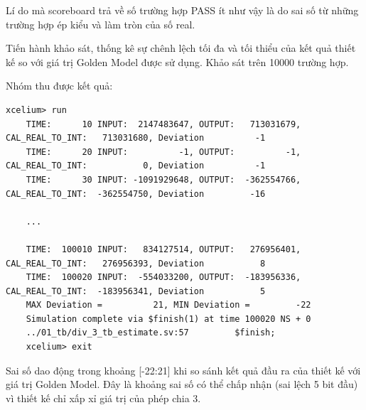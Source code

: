 \newpage

Lí do mà scoreboard trả về số trường hợp PASS ít như vậy là do sai số từ những trường hợp ép kiểu và làm tròn của số real.

Tiến hành khảo sát, thống kê sự chênh lệch tối đa và tối thiểu của kết quả thiết kế so với giá trị Golden Model được sử dụng. Khảo sát trên 10000 trường hợp.



Nhóm thu được kết quả:

\begin{lstlisting}[style=StyleResult, language=Result, caption={Kết quả kiểm định cho bộ xấp xỉ chia 3.}]
	xcelium> run
	TIME:      10 INPUT:  2147483647, OUTPUT:   713031679, CAL_REAL_TO_INT:   713031680, Deviation          -1
	TIME:      20 INPUT:          -1, OUTPUT:          -1, CAL_REAL_TO_INT:           0, Deviation          -1
	TIME:      30 INPUT: -1091929648, OUTPUT:  -362554766, CAL_REAL_TO_INT:  -362554750, Deviation         -16
	
	...
	
	TIME:  100010 INPUT:   834127514, OUTPUT:   276956401, CAL_REAL_TO_INT:   276956393, Deviation           8
	TIME:  100020 INPUT:  -554033200, OUTPUT:  -183956336, CAL_REAL_TO_INT:  -183956341, Deviation           5
	MAX Deviation =          21, MIN Deviation =         -22
	Simulation complete via $finish(1) at time 100020 NS + 0
	../01_tb/div_3_tb_estimate.sv:57         $finish;
	xcelium> exit
\end{lstlisting}

Sai số dao động trong khoảng [-22:21] khi so sánh kết quả đầu ra của thiết kế với giá trị Golden Model. Đây là khoảng sai số có thể chấp nhận (sai lệch 5 bit đầu) vì thiết kế chỉ xấp xỉ giá trị của phép chia 3.

